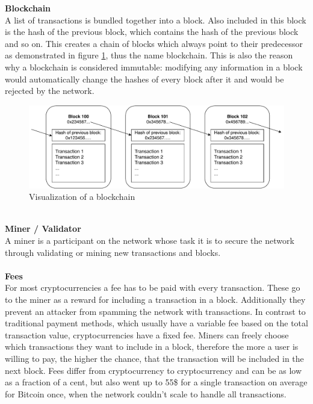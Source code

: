 \textbf{Blockchain}\\
A list of transactions is bundled together into a block.
Also included in this block is the hash of the previous block, which contains the hash of the previous block and so on.
This creates a chain of blocks\cite{bitcoin-whitepaper} which always point to their predecessor as demonstrated in figure \ref{fig:blockchain}, thus the name blockchain.
This is also the reason why a blockchain is considered immutable: modifying any information in a block would automatically change the hashes of every block after it and would be rejected by the network.
\newpage
\begin{figure}[H]
    \includegraphics[width=\textwidth]{img/blockchain.pdf}
    \caption{Visualization of a blockchain}
    \label{fig:blockchain}
\end{figure}
\leavevmode
\\

\textbf{Miner / Validator}\\
A miner is a participant on the network whose task it is to secure the network through validating or mining new transactions and blocks.
\\\\

\textbf{Fees}\\
For most cryptocurrencies a fee has to be paid with every transaction.
These go to the miner as a reward for including a transaction in a block.
Additionally they prevent an attacker from spamming the network with transactions.
In contrast to traditional payment methods, which usually have a variable fee based on the total transaction value, cryptocurrencies have a fixed fee.
Miners can freely choose which transactions they want to include in a block, therefore the more a user is willing to pay, the higher the chance, that the transaction will be included in the next block.
Fees differ from cryptocurrency to cryptocurrency and can be as low as a fraction of a cent, but also went up to 55\$ for a single transaction on average\cite{btc-fees} for Bitcoin once, when the network couldn't scale to handle all transactions.
\\\\

